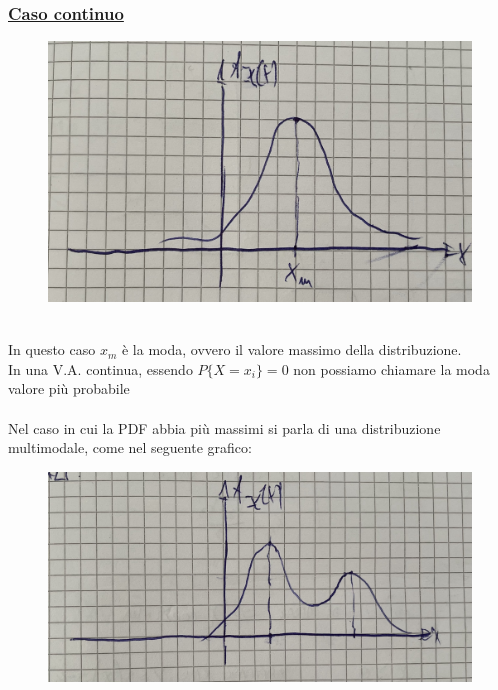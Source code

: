 \documentclass{article}
\begin{document}
\subsubsection{\underline{Caso continuo}}
\begin{figure}[ht]
\centering
\includegraphics[scale=0.10]{images/51.ModaContinua.jpeg}
\end{figure} ~\\
In questo caso $x_m$ è la moda, ovvero il valore massimo della distribuzione. \\
In una V.A. continua, essendo $P \big\{ X=x_i\big\} = 0$ non possiamo chiamare la moda valore più probabile \\ \\
Nel caso in cui la PDF abbia più massimi si parla di una distribuzione multimodale, come nel seguente grafico: ~\\
\begin{figure}[ht]
\centering
\includegraphics[scale=0.10]{images/52. ModaContinuaMultimod.jpeg}
\end{figure} ~\\
\end{document}
